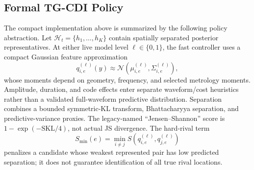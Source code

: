 \documentclass[conference]{IEEEtran}
\begin{document}
\subsection{Formal TG-CDI Policy}
The compact implementation above is summarized by the following policy abstraction. Let $\mathcal H_t=\{h_1,\ldots,h_K\}$ contain spatially separated posterior representatives. At either live model level $\ell\in\{0,1\}$, the fast controller uses a compact Gaussian feature approximation
\begin{equation}
 q^{(\ell)}_{i,e}(y)\approx
 \mathcal N\!\left(\mu^{(\ell)}_{i,e},\Sigma^{(\ell)}_{i,e}\right),
 \label{eq:rival-predictive}
\end{equation}
whose moments depend on geometry, frequency, and selected metrology moments. Amplitude, duration, and code effects enter separate waveform/cost heuristics rather than a validated full-waveform predictive distribution. Separation combines a bounded symmetric-KL transform, Bhattacharyya separation, and predictive-variance proxies. The legacy-named ``Jensen--Shannon'' score is $1-\exp(-\mathrm{SKL}/4)$, not actual JS divergence. The hard-rival term
\begin{equation}
 S_{\min}(e)=\min_{i\ne j}S\!\left(q^{(\ell)}_{i,e},q^{(\ell)}_{j,e}\right)
 \label{eq:hard-rival}
\end{equation}
penalizes a candidate whose weakest represented pair has low predicted separation; it does not guarantee identification of all true rival locations.
\end{document}
